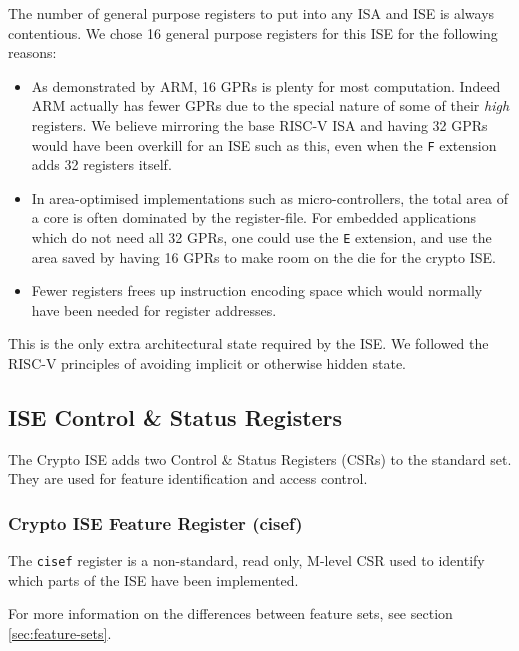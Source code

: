 
The number of general purpose registers to put into any ISA and ISE is
always contentious.
We chose 16 general purpose registers for this ISE for the following reasons:

\begin{itemize}
\item As demonstrated by ARM, 16 GPRs is plenty for most computation.
Indeed ARM actually has fewer GPRs due to the special nature of some of their
{\em high} registers.
We believe mirroring the base RISC-V ISA and having
32 GPRs would have been overkill for an ISE such as this, even when the
{\tt F} extension adds 32 registers itself.
\item In area-optimised implementations such as micro-controllers, the
total area of a core is often dominated by the register-file.
For embedded applications which do not need all 32 GPRs, one could use the 
{\tt E} extension, and use the area saved by having 16 GPRs to make room
on the die for the crypto ISE.
\item Fewer registers frees up instruction encoding space which would
normally have been needed for register addresses.
\end{itemize}

This is the only extra architectural state required by the ISE.
We followed the RISC-V principles of avoiding implicit or otherwise
hidden state.

\subsection{ISE Control \& Status Registers}

The Crypto ISE adds two Control \& Status Registers (CSRs) to the
standard set. They are used for feature identification and access
control.

\subsubsection{Crypto ISE Feature Register (cisef)}
\label{sec:csr-cisef}

The {\tt cisef} register is a non-standard, read only, M-level CSR
used to identify which parts of the ISE have been implemented.

For more information on the differences between feature sets, see
section \ref{sec:feature-sets}.

